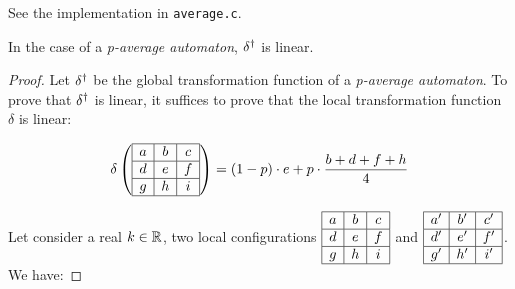\begin{question}
 
 See the implementation in \texttt{average.c}.
 
\end{question} 
 

\begin{question}
 
\begin{prop}
 In the case of a \textit{p-average automaton}, $\delta^{\dag}$ is linear.
\end{prop}

\begin{proof}
 Let $\delta^{\dag}$ be the global transformation function of a \textit{p-average automaton}. To prove that $\delta^{\dag}$ is linear, it suffices to prove that the local transformation function $\delta$ is linear:
 
 \[ \delta \left( \begin{array}{ | c | c | c |} \hline
  a & b & c \\ \hline
  d & e & f \\ \hline
  g & h & i \\ \hline
 \end{array} \right) = (1-p) \cdot e+p \cdot \frac{b+d+f+h}{4}\]
 
 Let consider a real $k \in \mathbb{R}$, two local configurations $\begin{array}{ | c | c | c |} \hline
  a & b & c \\ \hline
  d & e & f \\ \hline
  g & h & i \\ \hline
 \end{array}$ and $\begin{array}{ | c | c | c |} \hline
  a' & b' & c' \\ \hline
  d' & e' & f' \\ \hline
  g' & h' & i' \\ \hline
 \end{array}$. We have:
 

\end{proof}
\end{question}
